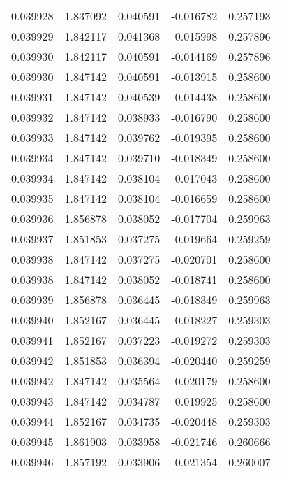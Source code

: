 \begin{tabular}{lrrrr}
0.039928    &  1.837092 &  0.040591 & -0.016782 &             0.257193 \\
0.039929    &  1.842117 &  0.041368 & -0.015998 &             0.257896 \\
0.039930    &  1.842117 &  0.040591 & -0.014169 &             0.257896 \\
0.039930    &  1.847142 &  0.040591 & -0.013915 &             0.258600 \\
0.039931    &  1.847142 &  0.040539 & -0.014438 &             0.258600 \\
0.039932    &  1.847142 &  0.038933 & -0.016790 &             0.258600 \\
0.039933    &  1.847142 &  0.039762 & -0.019395 &             0.258600 \\
0.039934    &  1.847142 &  0.039710 & -0.018349 &             0.258600 \\
0.039934    &  1.847142 &  0.038104 & -0.017043 &             0.258600 \\
0.039935    &  1.847142 &  0.038104 & -0.016659 &             0.258600 \\
0.039936    &  1.856878 &  0.038052 & -0.017704 &             0.259963 \\
0.039937    &  1.851853 &  0.037275 & -0.019664 &             0.259259 \\
0.039938    &  1.847142 &  0.037275 & -0.020701 &             0.258600 \\
0.039938    &  1.847142 &  0.038052 & -0.018741 &             0.258600 \\
0.039939    &  1.856878 &  0.036445 & -0.018349 &             0.259963 \\
0.039940    &  1.852167 &  0.036445 & -0.018227 &             0.259303 \\
0.039941    &  1.852167 &  0.037223 & -0.019272 &             0.259303 \\
0.039942    &  1.851853 &  0.036394 & -0.020440 &             0.259259 \\
0.039942    &  1.847142 &  0.035564 & -0.020179 &             0.258600 \\
0.039943    &  1.847142 &  0.034787 & -0.019925 &             0.258600 \\
0.039944    &  1.852167 &  0.034735 & -0.020448 &             0.259303 \\
0.039945    &  1.861903 &  0.033958 & -0.021746 &             0.260666 \\
0.039946    &  1.857192 &  0.033906 & -0.021354 &             0.260007 \\

\end{tabular}
